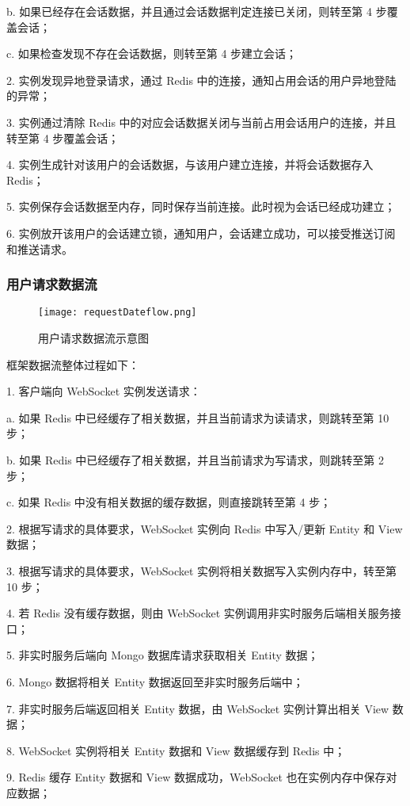 \quad{}\quad{}b. 如果已经存在会话数据，并且通过会话数据判定连接已关闭，则转至第 4 步覆盖会话；

\quad{}\quad{}c. 如果检查发现不存在会话数据，则转至第 4 步建立会话；

2. 实例发现异地登录请求，通过 Redis 中的连接，通知占用会话的用户异地登陆的异常；

3. 实例通过清除 Redis 中的对应会话数据关闭与当前占用会话用户的连接，并且转至第 4 步覆盖会话；

4. 实例生成针对该用户的会话数据，与该用户建立连接，并将会话数据存入 Redis；

5. 实例保存会话数据至内存，同时保存当前连接。此时视为会话已经成功建立；

6. 实例放开该用户的会话建立锁，通知用户，会话建立成功，可以接受推送订阅和推送请求。
\subsubsection{用户请求数据流}
\begin{figure}[!htp]
  \centering
  \texttt{[image: requestDateflow.png]}
  \caption[请求数据流]
    {用户请求数据流示意图}
 \label{fig:requestDateflow}
\end{figure}
框架数据流整体过程如下：

1. 客户端向 WebSocket 实例发送请求：

\quad{}\quad{}a. 如果 Redis 中已经缓存了相关数据，并且当前请求为读请求，则跳转至第 10 步；

\quad{}\quad{}b. 如果 Redis 中已经缓存了相关数据，并且当前请求为写请求，则跳转至第 2 步；

\quad{}\quad{}c. 如果 Redis 中没有相关数据的缓存数据，则直接跳转至第 4 步；

2. 根据写请求的具体要求，WebSocket 实例向 Redis 中写入/更新 Entity 和 View数据；

3. 根据写请求的具体要求，WebSocket 实例将相关数据写入实例内存中，转至第 10 步；

4. 若 Redis 没有缓存数据，则由 WebSocket 实例调用非实时服务后端相关服务接口；

5. 非实时服务后端向 Mongo 数据库请求获取相关 Entity 数据；

6. Mongo 数据将相关 Entity 数据返回至非实时服务后端中；

7. 非实时服务后端返回相关 Entity 数据，由 WebSocket 实例计算出相关 View 数据；

8. WebSocket 实例将相关 Entity 数据和 View 数据缓存到 Redis 中；

9. Redis 缓存 Entity 数据和 View 数据成功，WebSocket 也在实例内存中保存对应数据；

